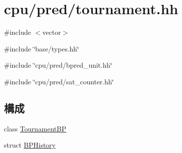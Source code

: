\hypertarget{tournament_8hh}{
\section{cpu/pred/tournament.hh}
\label{tournament_8hh}
}
{\ttfamily \#include $<$vector$>$}\par
{\ttfamily \#include \char`\"{}base/types.hh\char`\"{}}\par
{\ttfamily \#include \char`\"{}cpu/pred/bpred\_\-unit.hh\char`\"{}}\par
{\ttfamily \#include \char`\"{}cpu/pred/sat\_\-counter.hh\char`\"{}}\par
\subsection*{構成}
\begin{DoxyCompactItemize}
\item 
class \hyperlink{classTournamentBP}{TournamentBP}
\item 
struct \hyperlink{structTournamentBP_1_1BPHistory}{BPHistory}
\end{DoxyCompactItemize}
